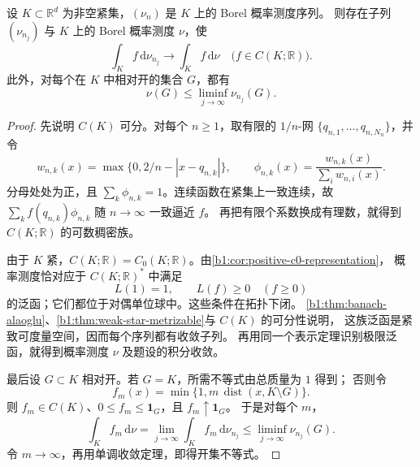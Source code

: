 \begin{lemma}[紧集上概率测度的序列紧性]\label{b1:lem:compact-probability-subsequence}
设 \(K\subset\mathbb R^d\) 为非空紧集，\((\nu_n)\) 是 \(K\) 上的 Borel 概率测度序列。
则存在子列 \((\nu_{n_j})\) 与 \(K\) 上的 Borel 概率测度 \(\nu\)，使
\[
 \int_K f\,\mathrm d\nu_{n_j}\longrightarrow\int_K f\,\mathrm d\nu
 \quad\bigl(f\in C(K;\mathbb R)\bigr).
\]
此外，对每个在 \(K\) 中相对开的集合 \(G\)，都有
\[
 \nu(G)\leq\liminf_{j\to\infty}\nu_{n_j}(G).
\]
\end{lemma}
\begin{proof}
先说明 \(C(K)\) 可分。对每个 \(n\geq1\)，取有限的 \(1/n\)-网
\(\{q_{n,1},\ldots,q_{n,N_n}\}\)，并令
\[
 w_{n,k}(x)=\max\{0,2/n-|x-q_{n,k}|\},
 \qquad
 \phi_{n,k}(x)=\frac{w_{n,k}(x)}{\sum_iw_{n,i}(x)}.
\]
分母处处为正，且 \(\sum_k\phi_{n,k}=1\)。连续函数在紧集上一致连续，故
\(\sum_k f(q_{n,k})\phi_{n,k}\) 随 \(n\to\infty\) 一致逼近 \(f\)。
再把有限个系数换成有理数，就得到 \(C(K;\mathbb R)\) 的可数稠密族。

由于 \(K\) 紧，\(C(K;\mathbb R)=C_0(K;\mathbb R)\)。由\cref{b1:cor:positive-c0-representation}，
概率测度恰对应于 \(C(K;\mathbb R)^*\) 中满足
\[
 L(1)=1,\qquad L(f)\geq0\quad(f\geq0)
\]
的泛函；它们都位于对偶单位球中。这些条件在\WeakStar{}拓扑下闭。
\cref{b1:thm:banach-alaoglu}、\cref{b1:thm:weak-star-metrizable}与 \(C(K)\) 的可分性说明，
这族泛函是紧致可度量空间，因而每个序列都有\WeakStar{}收敛子列。
再用同一个表示定理识别极限泛函，就得到概率测度 \(\nu\) 及题设的积分收敛。

最后设 \(G\subset K\) 相对开。若 \(G=K\)，所需不等式由总质量为 \(1\) 得到；
否则令
\[
 f_m(x)=\min\{1,m\,\operatorname{dist}(x,K\setminus G)\}.
\]
则 \(f_m\in C(K)\)、\(0\leq f_m\leq\mathbf1_G\)，且 \(f_m\uparrow\mathbf1_G\)。
于是对每个 \(m\)，
\[
 \int_K f_m\,\mathrm d\nu
 =\lim_{j\to\infty}\int_K f_m\,\mathrm d\nu_{n_j}
 \leq\liminf_{j\to\infty}\nu_{n_j}(G).
\]
令 \(m\to\infty\)，再用单调收敛定理，即得开集不等式。
\end{proof}

